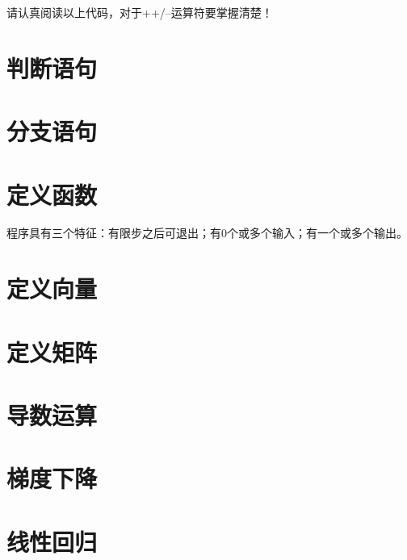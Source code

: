 \noindent
请认真阅读以上代码，对于++/--运算符要掌握清楚！

\section{判断语句}

\section{分支语句}

\section{定义函数}
程序具有三个特征：有限步之后可退出；有0个或多个输入；有一个或多个输出。


\section{定义向量}

\section{定义矩阵}

\section{导数运算}

\section{梯度下降}

\section{线性回归}
